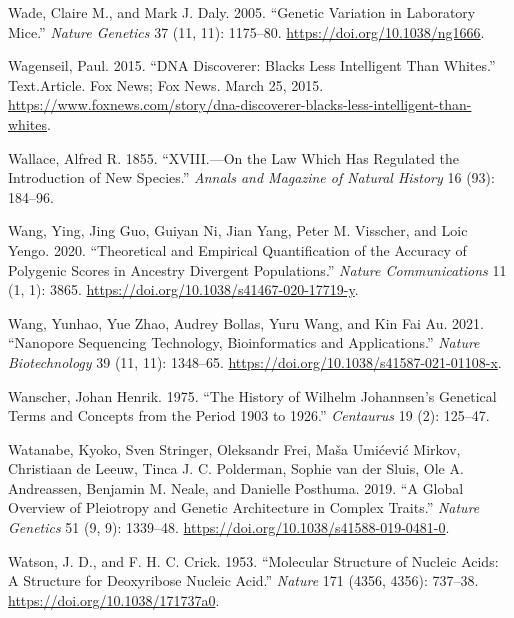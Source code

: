 \documentclass[
]{book}
\newlength{\cslhangindent}
\newlength{\cslentryspacingunit} %
\newenvironment{CSLReferences}[2] %
 {%
  \setlength{\parindent}{0pt}
  \ifodd #1
  \let\oldpar\par
  \def\par{\hangindent=\cslhangindent\oldpar}
  \fi
  \setlength{\parskip}{#2\cslentryspacingunit}
 }%
 {}
\begin{document}
\begin{CSLReferences}{1}{0}
\leavevmode{}%
Wade, Claire M., and Mark J. Daly. 2005. {``Genetic Variation in Laboratory Mice.''} \emph{Nature Genetics} 37 (11, 11): 1175--80. \url{https://doi.org/10.1038/ng1666}.

\leavevmode{}%
Wagenseil, Paul. 2015. {``{DNA Discoverer}: {Blacks Less Intelligent Than Whites}.''} Text.Article. {Fox News}; {Fox News}. March 25, 2015. \url{https://www.foxnews.com/story/dna-discoverer-blacks-less-intelligent-than-whites}.

\leavevmode{}%
Wallace, Alfred R. 1855. {``{XVIII}.---{On} the Law Which Has Regulated the Introduction of New Species.''} \emph{Annals and Magazine of Natural History} 16 (93): 184--96.

\leavevmode{}%
Wang, Ying, Jing Guo, Guiyan Ni, Jian Yang, Peter M. Visscher, and Loic Yengo. 2020. {``Theoretical and Empirical Quantification of the Accuracy of Polygenic Scores in Ancestry Divergent Populations.''} \emph{Nature Communications} 11 (1, 1): 3865. \url{https://doi.org/10.1038/s41467-020-17719-y}.

\leavevmode{}%
Wang, Yunhao, Yue Zhao, Audrey Bollas, Yuru Wang, and Kin Fai Au. 2021. {``Nanopore Sequencing Technology, Bioinformatics and Applications.''} \emph{Nature Biotechnology} 39 (11, 11): 1348--65. \url{https://doi.org/10.1038/s41587-021-01108-x}.

\leavevmode{}%
Wanscher, Johan Henrik. 1975. {``The History of {Wilhelm Johannsen}'s Genetical Terms and Concepts from the Period 1903 to 1926.''} \emph{Centaurus} 19 (2): 125--47.

\leavevmode{}%
Watanabe, Kyoko, Sven Stringer, Oleksandr Frei, Maša Umićević Mirkov, Christiaan de Leeuw, Tinca J. C. Polderman, Sophie van der Sluis, Ole A. Andreassen, Benjamin M. Neale, and Danielle Posthuma. 2019. {``A Global Overview of Pleiotropy and Genetic Architecture in Complex Traits.''} \emph{Nature Genetics} 51 (9, 9): 1339--48. \url{https://doi.org/10.1038/s41588-019-0481-0}.

\leavevmode{}%
Watson, J. D., and F. H. C. Crick. 1953. {``Molecular {Structure} of {Nucleic Acids}: {A Structure} for {Deoxyribose Nucleic Acid}.''} \emph{Nature} 171 (4356, 4356): 737--38. \url{https://doi.org/10.1038/171737a0}.


\end{CSLReferences}
\end{document}
